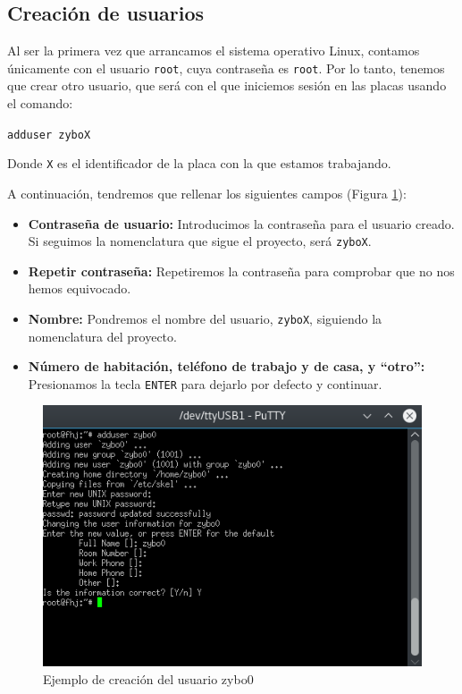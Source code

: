 \newpage
\subsection{Creación de usuarios}
Al ser la primera vez que arrancamos el sistema operativo Linux, contamos únicamente con el usuario \texttt{root}, cuya contraseña es \texttt{root}. Por lo tanto, tenemos que crear otro usuario, que será con el que iniciemos sesión en las placas usando el comando:
\begin{center}
	\texttt{adduser zyboX}
\end{center}
Donde \texttt{X} es el identificador de la placa con la que estamos trabajando.

A continuación, tendremos que rellenar los siguientes campos (Figura \ref{Ejemplo de creación del usuario zybo0}):
\begin{itemize}
	\item \textbf{Contraseña de usuario:} Introducimos la contraseña para el usuario creado. Si seguimos la nomenclatura que sigue el proyecto, será \texttt{zyboX}.
	\item \textbf{Repetir contraseña:} Repetiremos la contraseña para comprobar que no nos hemos equivocado.
	\item \textbf{Nombre:} Pondremos el nombre del usuario, \texttt{zyboX}, siguiendo la nomenclatura del proyecto.
	\item \textbf{Número de habitación, teléfono de trabajo y de casa, y ``otro'':} Presionamos la tecla \texttt{ENTER} para dejarlo por defecto y continuar.
\end{itemize}

\begin{figure}[h]
	\centering
	\includegraphics[scale=0.9]{Anexos/Anexo2/Linux/NuevoUsuario.png}
	\caption{Ejemplo de creación del usuario zybo0}
	\label{Ejemplo de creación del usuario zybo0}
\end{figure}


